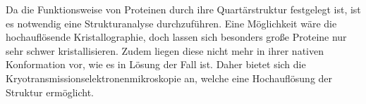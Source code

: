 Da die Funktionsweise von Proteinen durch ihre Quartärstruktur festgelegt ist, ist es notwendig eine Strukturanalyse durchzuführen.
Eine Möglichkeit wäre die hochauflösende Kristallographie, doch lassen sich besonders große Proteine nur sehr schwer kristallisieren.
Zudem liegen diese nicht mehr in ihrer nativen Konformation vor, wie es in Lösung der Fall ist.
Daher bietet sich die Kryotransmissionselektronenmikroskopie an, welche eine Hochauflösung der Struktur ermöglicht.

\FloatBarrier